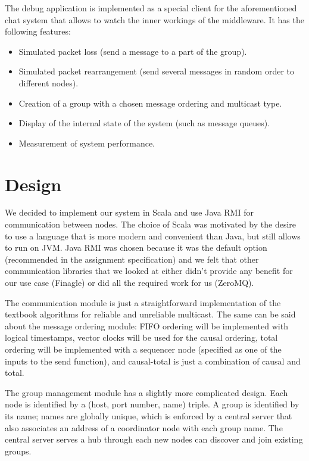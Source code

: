 \documentclass[10pt, oneside]{article}
\begin{document}
The debug application is implemented as a special client for the aforementioned
chat system that allows to watch the inner workings of the middleware. It has
the following features:
\begin{itemize}
\item Simulated packet loss (send a message to a part of the group).
\item Simulated packet rearrangement (send several messages in random order to
  different nodes).
\item Creation of a group with a chosen message ordering and multicast type.
\item Display of the internal state of the system (such as message queues).
\item Measurement of system performance.
\end{itemize}

\section{Design}

We decided to implement our system in Scala and use Java RMI for communication
between nodes. The choice of Scala was motivated by the desire to use a language
that is more modern and convenient than Java, but still allows to run on
JVM. Java RMI was chosen because it was the default option (recommended in the
assignment specification) and we felt that other communication libraries that we
looked at either didn't provide any benefit for our use case (Finagle) or did
all the required work for us (ZeroMQ).

The communication module is just a straightforward implementation of the
textbook algorithms for reliable and unreliable multicast\cite{Textbook}. The
same can be said about the message ordering module: FIFO ordering will be
implemented with logical timestamps, vector clocks will be used for the causal
ordering, total ordering will be implemented with a sequencer node (specified as
one of the inputs to the send function), and causal-total is just a combination
of causal and total.

The group management module has a slightly more complicated design. Each node is
identified by a (host, port number, name) triple. A group is identified by its
name; names are globally unique, which is enforced by a central server that also
associates an address of a coordinator node with each group name. The central
server serves a hub through each new nodes can discover and join existing
groups.
\end{document}
